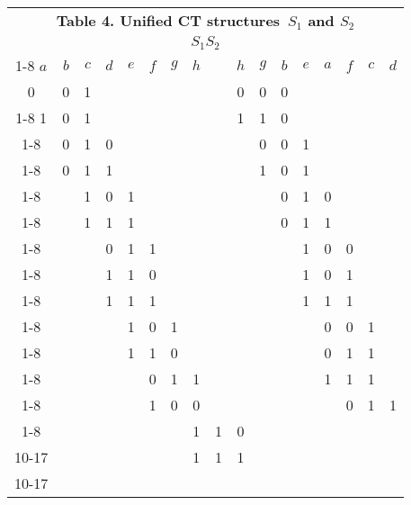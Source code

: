 \documentclass[12pt, a4paper]{article}
\begin{document}
\begin{table}[p]
\centering
\begin{tabular}{|c|c|c|c|c|c|c|c|c|c|c|c|c|c|c|c|c|}
\multicolumn{17}{c}{\bf Table 4. Unified CT structures \,$S_1$ and  $S_2$}\\
\multicolumn{17}{c}{$S_1$\hspace{5cm}$S_2$}\\
\cline{1-8}
\cline{10-17}
$a$&$b$&$c$&$d$&$e$&$f$&$g$&$h$&&$h$&$g$&$b$&$e$&$a$&$f$&$c$&$d$\\
\hhline{|=|=|=|=|=|=|=|=|~|=|=|=|=|=|=|=|=|}
0&0&1&&&&&& &0&0&0&&&&&\\
\cline{1-8}                                                        \cline{10-17}
1&0&1&&&&&& &1&1&0&&&&&\\
\cline{1-8}                                                        \cline{10-17}
&0&1&0&&&&& &&0&0&1&&&&\\
\cline{1-8}                                                        \cline{10-17}
&0&1&1&&&&& &&1&0&1&&&&\\
\cline{1-8}                                                        \cline{10-17}
&&1&0&1&&&& &&&0&1&0&&&\\
\cline{1-8}                                                        \cline{10-17}
&&1&1&1&&&& &&&0&1&1&&&\\
\cline{1-8}                                                        \cline{10-17}
&&&0&1&1&&& &&&&1&0&0&&\\
\cline{1-8}                                                        \cline{10-17}
&&&1&1&0&&& &&&&1&0&1&&\\
\cline{1-8}                                                        \cline{10-17}
&&&1&1&1&&& &&&&1&1&1&&\\
\cline{1-8}                                                        \cline{10-17}
&&&&1&0&1&& &&&&&0&0&1&\\
\cline{1-8}                                                        \cline{10-17}
&&&&1&1&0&& &&&&&0&1&1&\\
\cline{1-8}                                                        \cline{10-17}
&&&&&0&1&1& &&&&&1&1&1&\\
\cline{1-8}                                                        \cline{10-17}
&&&&&1&0&0& &&&&&&0&1&1\\
\cline{1-8}                                                        \cline{10-17}
\multicolumn{8}{}{}    &&&&&&&1&1&0\\
                                                        \cline{10-17}
\multicolumn{8}{}{}    &&&&&&&1&1&1\\
                                                        \cline{10-17}
\end{tabular}
\end{table}
\end{document}
